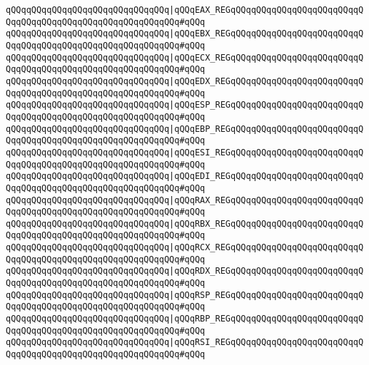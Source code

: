 \verb|qQQqqQQqqQQqqQQqqQQqqQQqqQQqqQQq|\verb#|qQQqEAX_REGqQQqqQQqqQQqqQQqqQQqqQQqqQQqqQQqqQQqqQQqqQQqqQQqqQQqqQQqqQQq#\verb|#qQQq|\newline
\verb|qQQqqQQqqQQqqQQqqQQqqQQqqQQqqQQq|\verb#|qQQqEBX_REGqQQqqQQqqQQqqQQqqQQqqQQqqQQqqQQqqQQqqQQqqQQqqQQqqQQqqQQqqQQq#\verb|#qQQq|\newline
\verb|qQQqqQQqqQQqqQQqqQQqqQQqqQQqqQQq|\verb#|qQQqECX_REGqQQqqQQqqQQqqQQqqQQqqQQqqQQqqQQqqQQqqQQqqQQqqQQqqQQqqQQqqQQq#\verb|#qQQq|\newline
\verb|qQQqqQQqqQQqqQQqqQQqqQQqqQQqqQQq|\verb#|qQQqEDX_REGqQQqqQQqqQQqqQQqqQQqqQQqqQQqqQQqqQQqqQQqqQQqqQQqqQQqqQQqqQQq#\verb|#qQQq|\newline
\verb|qQQqqQQqqQQqqQQqqQQqqQQqqQQqqQQq|\verb#|qQQqESP_REGqQQqqQQqqQQqqQQqqQQqqQQqqQQqqQQqqQQqqQQqqQQqqQQqqQQqqQQqqQQq#\verb|#qQQq|\newline
\verb|qQQqqQQqqQQqqQQqqQQqqQQqqQQqqQQq|\verb#|qQQqEBP_REGqQQqqQQqqQQqqQQqqQQqqQQqqQQqqQQqqQQqqQQqqQQqqQQqqQQqqQQqqQQq#\verb|#qQQq|\newline
\verb|qQQqqQQqqQQqqQQqqQQqqQQqqQQqqQQq|\verb#|qQQqESI_REGqQQqqQQqqQQqqQQqqQQqqQQqqQQqqQQqqQQqqQQqqQQqqQQqqQQqqQQqqQQq#\verb|#qQQq|\newline
\verb|qQQqqQQqqQQqqQQqqQQqqQQqqQQqqQQq|\verb#|qQQqEDI_REGqQQqqQQqqQQqqQQqqQQqqQQqqQQqqQQqqQQqqQQqqQQqqQQqqQQqqQQqqQQq#\verb|#qQQq|\newline
\verb|qQQqqQQqqQQqqQQqqQQqqQQqqQQqqQQq|\verb#|qQQqRAX_REGqQQqqQQqqQQqqQQqqQQqqQQqqQQqqQQqqQQqqQQqqQQqqQQqqQQqqQQqqQQq#\verb|#qQQq|\newline
\verb|qQQqqQQqqQQqqQQqqQQqqQQqqQQqqQQq|\verb#|qQQqRBX_REGqQQqqQQqqQQqqQQqqQQqqQQqqQQqqQQqqQQqqQQqqQQqqQQqqQQqqQQqqQQq#\verb|#qQQq|\newline
\verb|qQQqqQQqqQQqqQQqqQQqqQQqqQQqqQQq|\verb#|qQQqRCX_REGqQQqqQQqqQQqqQQqqQQqqQQqqQQqqQQqqQQqqQQqqQQqqQQqqQQqqQQqqQQq#\verb|#qQQq|\newline
\verb|qQQqqQQqqQQqqQQqqQQqqQQqqQQqqQQq|\verb#|qQQqRDX_REGqQQqqQQqqQQqqQQqqQQqqQQqqQQqqQQqqQQqqQQqqQQqqQQqqQQqqQQqqQQq#\verb|#qQQq|\newline
\verb|qQQqqQQqqQQqqQQqqQQqqQQqqQQqqQQq|\verb#|qQQqRSP_REGqQQqqQQqqQQqqQQqqQQqqQQqqQQqqQQqqQQqqQQqqQQqqQQqqQQqqQQqqQQq#\verb|#qQQq|\newline
\verb|qQQqqQQqqQQqqQQqqQQqqQQqqQQqqQQq|\verb#|qQQqRBP_REGqQQqqQQqqQQqqQQqqQQqqQQqqQQqqQQqqQQqqQQqqQQqqQQqqQQqqQQqqQQq#\verb|#qQQq|\newline
\verb|qQQqqQQqqQQqqQQqqQQqqQQqqQQqqQQq|\verb#|qQQqRSI_REGqQQqqQQqqQQqqQQqqQQqqQQqqQQqqQQqqQQqqQQqqQQqqQQqqQQqqQQqqQQq#\verb|#qQQq|\newline
